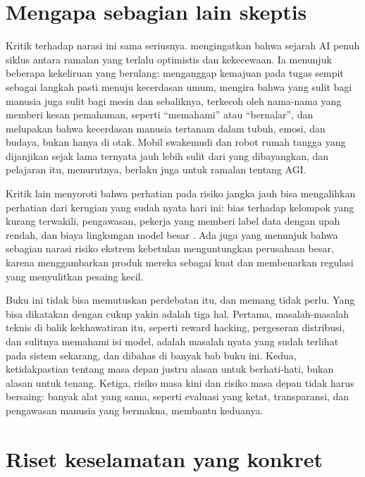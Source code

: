\section{Mengapa sebagian lain skeptis}

Kritik terhadap narasi ini sama seriusnya. \citet{mitchell2021} mengingatkan bahwa sejarah AI penuh siklus antara ramalan yang terlalu
optimistis dan kekecewaan. Ia menunjuk beberapa kekeliruan yang berulang: menganggap kemajuan pada tugas sempit sebagai langkah
pasti menuju kecerdasan umum, mengira bahwa yang sulit bagi manusia juga sulit bagi mesin dan sebaliknya, terkecoh oleh nama-nama
yang memberi kesan pemahaman, seperti ``memahami'' atau ``bernalar'', dan melupakan bahwa kecerdasan manusia tertanam dalam tubuh,
emosi, dan budaya, bukan hanya di otak. Mobil swakemudi dan robot rumah tangga yang dijanjikan sejak lama ternyata jauh lebih sulit
dari yang dibayangkan, dan pelajaran itu, menurutnya, berlaku juga untuk ramalan tentang AGI.

Kritik lain menyoroti bahwa perhatian pada risiko jangka jauh bisa mengalihkan perhatian dari kerugian yang sudah nyata hari ini:
bias terhadap kelompok yang kurang terwakili, pengawasan, pekerja yang memberi label data dengan upah rendah, dan biaya lingkungan
model besar \citep{bender2021}. Ada juga yang menunjuk bahwa sebagian narasi risiko ekstrem kebetulan menguntungkan perusahaan besar,
karena menggambarkan produk mereka sebagai kuat dan membenarkan regulasi yang menyulitkan pesaing kecil.

Buku ini tidak bisa memutuskan perdebatan itu, dan memang tidak perlu. Yang bisa dikatakan dengan cukup yakin adalah tiga hal. Pertama,
masalah-masalah teknis di balik kekhawatiran itu, seperti reward hacking, pergeseran distribusi, dan sulitnya memahami isi model, adalah
masalah nyata yang sudah terlihat pada sistem sekarang, dan dibahas di banyak bab buku ini. Kedua, ketidakpastian tentang masa depan
justru alasan untuk berhati-hati, bukan alasan untuk tenang. Ketiga, risiko masa kini dan risiko masa depan tidak harus bersaing:
banyak alat yang sama, seperti evaluasi yang ketat, transparansi, dan pengawasan manusia yang bermakna, membantu keduanya.

\section{Riset keselamatan yang konkret}

